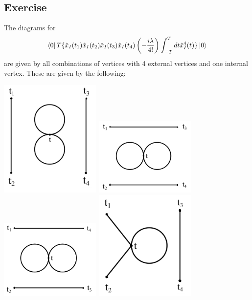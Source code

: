 \subsection{Exercise}
The diagrams for 
\begin{equation}
    \bra{0} T\{\hat x_I(t_1)\hat x_I(t_2)\hat x_I(t_3)\hat x_I(t_4)\left(-\frac{i\lambda}{4!}\right)\int_{-T}^T dt \hat x_I^4(t)\}\ket{0}
\end{equation}
are given by all combinations of vertices with 4 external vertices and one internal vertex. These are given by the following:
\begin{center}
    \includegraphics[width=5cm]{sections/IMG_1200.jpeg}
    \includegraphics[width=5cm]{sections/IMG_1202.jpeg}
    \includegraphics[width=5cm]{sections/IMG_1203.jpeg}
    \includegraphics[width=5cm]{sections/IMG_1204.jpeg}

\end{center}
